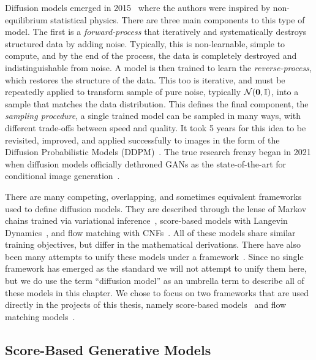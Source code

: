 Diffusion models emerged in 2015~\cite{DeepUnsupervisedLearning} where the authors were inspired by non-equilibrium statistical physics.
There are three main components to this type of model.
The first is a \textit{forward-process} that iteratively and systematically destroys structured data by adding noise.
Typically, this is non-learnable, simple to compute, and by the end of the process, the data is completely destroyed and indistinguishable from noise.
A model is then trained to learn the \textit{reverse-process}, which restores the structure of the data.
This too is iterative, and must be repeatedly applied to transform sample of pure noise, typically $\mathcal{N}(\mathbf{0}, \mathbb{I})$, into a sample that matches the data distribution.
This defines the final component, the \textit{sampling procedure}, a single trained model can be sampled in many ways, with different trade-offs between speed and quality.
It took 5 years for this idea to be revisited, improved, and applied successfully to images in the form of the Diffusion Probabilistic Models (DDPM)~\cite{DDPM}.
The true research frenzy began in 2021 when diffusion models officially dethroned GANs as the state-of-the-art for conditional image generation~\cite{DiffusionBeatsGANS}.

There are many competing, overlapping, and sometimes equivalent frameworks used to define diffusion models.
They are described through the lense of Markov chains trained via variational inference~\cite{DDPM, DDIM}, score-based models with Langevin Dynamics~\cite{ScoreBasedGenerativeModeling, ElucidatingDesignSpace}, and flow matching with CNFs~\cite{FlowStraightFast, FlowMatchingGenerative}.
All of these models share similar training objectives, but differ in the mathematical derivations.
There have also been many attempts to unify these models under a framework~\cite{CM2, ElucidatingDesignSpace,UnderstandingDiffusionModels, StochasticInterpolants, FlowStraightFast}.
Since no single framework has emerged as the standard we will not attempt to unify them here, but we do use the term ``diffusion model'' as an umbrella term to describe all of these models in this chapter.
We chose to focus on two frameworks that are used directly in the projects of this thesis, namely score-based models~\cite{ScoreBasedGenerativeModeling} and flow matching models~\cite{FlowMatchingGenerative, FlowStraightFast}.

\subsection{Score-Based Generative Models}
\newcommand{\score}{\nabla_{\x_t} \log p(\x_t)}
\newcommand{\cscore}{\nabla_{\x_t} \log p(\x_t|\x_0)}
\newcommand{\unitime}{\mathcal{U}(0, T)}
\newcommand{\timeone}{\mathcal{U}(0, 1)}

